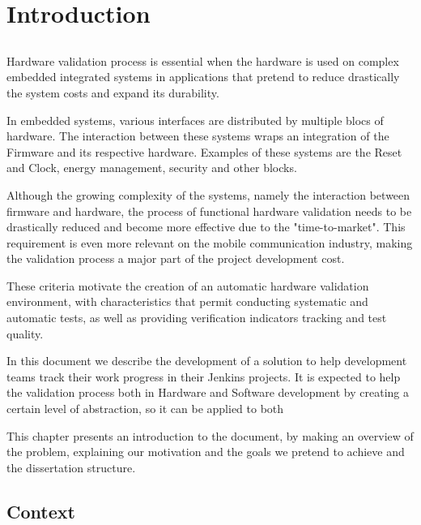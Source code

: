 \chapter{Introduction} \label{chap:intro}

\section*{}

Hardware validation process is essential when the hardware is used on complex embedded integrated systems in applications that pretend to reduce drastically the system costs and expand its durability\cite{TroyScott}.

In embedded systems, various interfaces are distributed by multiple blocs of hardware. The interaction between these systems wraps an integration of the Firmware and its respective hardware. Examples of these systems are the Reset and Clock, energy management, security and other blocks\cite{Abarbanel}.

Although the growing complexity of the systems, namely the interaction between firmware and hardware, the process of functional hardware validation needs to be drastically reduced and become more effective due to the "time-to-market". This requirement is even more relevant on the mobile communication industry, making the validation process a major part of the project development cost\cite{Puri-Jobi2015}.

These criteria motivate the creation of an automatic hardware validation environment, with characteristics that permit conducting systematic and automatic tests, as well as providing verification indicators tracking and test quality\cite{ShixiaoYan2015}\cite{Gupta11titleantares}.

In this document we describe the development of a solution to help development teams track their work progress in their Jenkins projects. It is expected to help the validation process both in Hardware and Software development by creating a certain level of abstraction, so it can be applied to both

This chapter presents an introduction to the document, by making an overview of the problem, explaining our motivation and the goals we pretend to achieve and the dissertation structure.

\section{Context} \label{sec:context}

